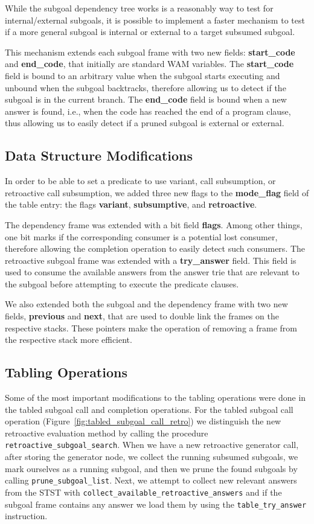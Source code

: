 While the subgoal dependency tree works is a reasonably way to test for internal/external
subgoals, it is possible to implement a faster mechanism to test if a more general subgoal
is internal or external to a target subsumed subgoal.

This mechanism extends each subgoal frame with two new fields: \textbf{start\_code}
and \textbf{end\_code}, that initially are standard WAM variables.
The \textbf{start\_code} field is bound to an arbitrary value when the subgoal starts
executing and unbound when the subgoal backtracks, therefore allowing us to detect
if the subgoal is in the current branch. The \textbf{end\_code} field is bound
when a new answer is found, i.e., when the code has reached the end of a program
clause, thus allowing us to easily detect if a pruned subgoal is external or external.

\subsection{Data Structure Modifications}

In order to be able to set a predicate to use variant, call subsumption, or retroactive call
subsumption, we added three new flags to the \textbf{mode\_flag} field of the table entry: the flags
\textbf{variant}, \textbf{subsumptive}, and \textbf{retroactive}.

The dependency frame was extended with a bit field \textbf{flags}. Among other things,
one bit marks if the corresponding consumer is a potential lost consumer, therefore allowing
the completion operation to easily detect such consumers.
The retroactive subgoal frame was extended with a \textbf{try\_answer} field. This field is used
to consume the available answers from the answer trie that are relevant to the subgoal
before attempting to execute the predicate clauses.

We also extended both the subgoal and the dependency frame with two new fields, \textbf{previous} and
\textbf{next}, that are used to double link the frames on the respective stacks. These pointers
make the operation of removing a frame from the respective stack more efficient.

\subsection{Tabling Operations}

Some of the most important modifications to the tabling operations were done in the tabled subgoal call and
completion operations. For the tabled subgoal call operation (Figure~\ref{fig:tabled_subgoal_call_retro})
we distinguish the new retroactive evaluation method by calling the procedure \texttt{retroactive\_subgoal\_search}.
When we have a new retroactive generator call, after storing the
generator node, we collect the running subsumed subgoals, we mark ourselves as a running subgoal, and
then we prune the found subgoals by calling \texttt{prune\_subgoal\_list}.
Next, we attempt to collect new relevant answers from the STST with
\texttt{collect\_available\_retroactive\_answers} and if the subgoal frame contains any answer
we load them by using the \texttt{table\_try\_answer} instruction.

